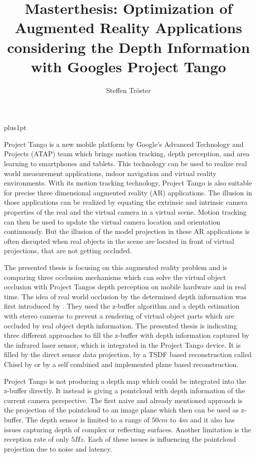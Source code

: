 \documentclass[12pt]{support/thcolognereport}
\title{Masterthesis: Optimization of Augmented Reality Applications considering the Depth Information with Googles Project Tango}
\author{Steffen Tröster}
\begin{document}
\baselineskip=18pt plus1pt

\maketitle 

\setlength{\parskip}{1em}

Project Tango is a new mobile platform by Google’s Advanced Technology and Projects (ATAP) team which brings motion tracking, depth perception, and area learning to smartphones and tablets. This technology can be used to realize real world measurement applications, indoor navigation and virtual reality environments.  With its motion tracking technology, Project Tango is also suitable for precise three dimensional augmented reality (AR) applications. The illusion in those applications can be realized by equating the extrinsic and intrinsic camera properties of the real and the virtual camera in a virtual scene. Motion tracking can then be used to update the virtual camera location and orientation continuously. But the illusion of the model projection in these AR applications is often disrupted when real objects in the scene are located in front of virtual projections, that are not getting occluded.

The presented thesis is focusing on this augmented reality problem and is comparing three occlusion mechanisms which can solve the virtual object occlusion with Project Tangos depth perception on mobile hardware and in real time. The idea of real world occlusion by the determined depth information was first introduced by \citet{wloka1995resolving}. They used the z-buffer algorithm and a depth estimation with stereo cameras to prevent a rendering of virtual object parts which are occluded by real object depth information. The presented thesis is indicating three different approaches to fill the z-buffer with depth information captured by the infrared laser sensor, which is integrated in the Project Tango device. It is filled by the direct sensor data projection, by a TSDF based reconstruction called Chisel by \citet{Klingensmith_2015_7924} or by a self combined and implemented plane based reconstruction. 

Project Tango is not producing a depth map which could be integrated into the z-buffer directly. It instead is giving a pointcloud with depth information of the current camera perspective. The first naive and already mentioned approach is the projection of the pointcloud to an image plane which then can be used as z-buffer. The depth sensor is limited to a range of \(50cm\) to \(4m\) and it also has issues capturing depth of complex or reflecting surfaces. Another limitation is the reception rate of only \(5Hz\). Each of these issues is influencing the pointcloud projection due to noise and latency.
\end{document}
